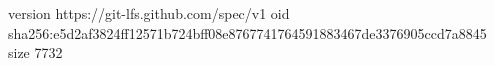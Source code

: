 version https://git-lfs.github.com/spec/v1
oid sha256:e5d2af3824ff12571b724bff08e8767741764591883467de3376905ccd7a8845
size 7732
